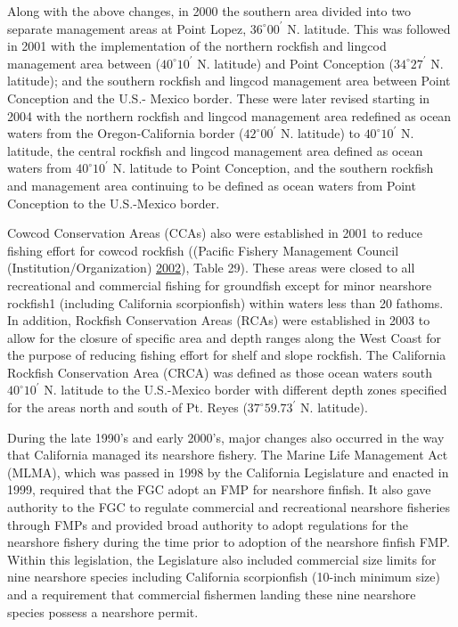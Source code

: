 \documentclass[12pt,]{article}
\begin{document}
Along with the above changes, in 2000 the southern area divided into two
separate management areas at Point Lopez, \(36^\circ 00^\prime\) N.
latitude. This was followed in 2001 with the implementation of the
northern rockfish and lingcod management area between
(\(40^\circ 10^\prime\) N. latitude) and Point Conception
(\(34^\circ 27^\prime\) N. latitude); and the southern rockfish and
lingcod management area between Point Conception and the U.S.- Mexico
border. These were later revised starting in 2004 with the northern
rockfish and lingcod management area redefined as ocean waters from the
Oregon-California border (\(42^\circ 00^\prime\) N. latitude) to
\(40^\circ 10^\prime\) N. latitude, the central rockfish and lingcod
management area defined as ocean waters from \(40^\circ 10^\prime\) N.
latitude to Point Conception, and the southern rockfish and management
area continuing to be defined as ocean waters from Point Conception to
the U.S.-Mexico border.

Cowcod Conservation Areas (CCAs) also were established in 2001 to reduce
fishing effort for cowcod rockfish ((Pacific Fishery Management Council
(Institution/Organization) \protect\hyperlink{ref-PFMC2002}{2002}),
Table 29). These areas were closed to all recreational and commercial
fishing for groundfish except for minor nearshore rockfish1 (including
California scorpionfish) within waters less than 20 fathoms. In
addition, Rockfish Conservation Areas (RCAs) were established in 2003 to
allow for the closure of specific area and depth ranges along the West
Coast for the purpose of reducing fishing effort for shelf and slope
rockfish. The California Rockfish Conservation Area (CRCA) was defined
as those ocean waters south \(40^\circ 10^\prime\) N. latitude to the
U.S.-Mexico border with different depth zones specified for the areas
north and south of Pt. Reyes (\(37^\circ 59.73^\prime\) N. latitude).

During the late 1990's and early 2000's, major changes also occurred in
the way that California managed its nearshore fishery. The Marine Life
Management Act (MLMA), which was passed in 1998 by the California
Legislature and enacted in 1999, required that the FGC adopt an FMP for
nearshore finfish. It also gave authority to the FGC to regulate
commercial and recreational nearshore fisheries through FMPs and
provided broad authority to adopt regulations for the nearshore fishery
during the time prior to adoption of the nearshore finfish FMP. Within
this legislation, the Legislature also included commercial size limits
for nine nearshore species including California scorpionfish (10-inch
minimum size) and a requirement that commercial fishermen landing these
nine nearshore species possess a nearshore permit.
\end{document}
